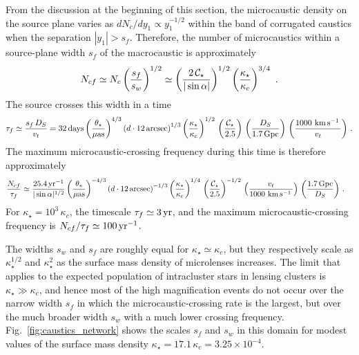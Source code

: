 \documentclass{aastex6}
\newcommand{\reffig}[1]{Fig.~\ref{fig:#1}}
\def\kms{\, {\rm km}\, {\rm s}^{-1}\, }
\begin{document}
From the discussion at the beginning of this section, the microcaustic density on the source plane varies as $dN_c/dy_1 \propto y_1^{-1/2}$ within the band of corrugated caustics when the separation $| y_1 | > s_f$. Therefore, the number of microcaustics within a source-plane width $s_f$ of the macrocaustic is approximately
\begin{equation}
\label{eq:ncf}
 N_{cf} \simeq N_c \left( s_f\over s_w \right)^{1/2} \simeq
   \left( 2\, \mathcal{C}_{\star} \over | \sin\alpha | \right)^{1/2}
  \left( \kappa_\star \over \kappa_c \right)^{3/4} ~.
\end{equation}
The source crosses this width in a time
\begin{align}
  \label{eq:tauf}
  \tau_{f} \simeq \frac{s_f\,D_S}{v_t} =
    32 \, {\rm days}
  \left( \frac{\theta_\star}{\mu{\rm as}} \right)^{4/3}
  \left( {d \cdot 12 \, {\rm arcsec}} \right)^{1/3}
  \left( \frac{\kappa_\star}{\kappa_c} \right)^{1/2}\, \left( {\mathcal{C}_{\star}\over 2.5} \right)\,
   \left( \frac{D_S}{1.7\,{\rm Gpc}} \right) \, \left( \frac{1000\,\kms}{v_t} \right)\,.
\end{align}
The maximum microcaustic-crossing frequency during this time is therefore approximately
\begin{align}
\label{eq:dNdtmax}
  \frac{N_{cf}}{\tau_f} & \simeq
 \frac{ 25.4 \, {\rm yr}^{-1} }{\vert \sin{\alpha} \vert^{1/2}} \left( \frac{\theta_*}{\mu{\rm as}} \right)^{-4/3} 
 \left( d\cdot 12 \, {\rm arcsec} \right)^{-1/3}
 \left( \frac{\kappa_*}{\kappa_c} \right)^{1/4}\,\left( {\mathcal{C}_{\star} \over 2.5} \right)^{-1/2}
  \,\left( \frac{v_t}{1000 \, \kms} \right) \, \left( \frac{1.7 \, {\rm Gpc}}{D_S} \right) \,.
\end{align}
For $\kappa_\star = 10^3\, \kappa_c$, the timescale $\tau_f \simeq 3 \, {\rm yr}$, and the maximum microcaustic-crossing frequency is $N_{cf} / \tau_f \simeq 100 \, {\rm yr}^{-1}$.

The widths $s_w$ and $s_f$ are roughly equal for $\kappa_\star \simeq \kappa_c$, but they respectively scale as $\kappa_\star^{1/2}$ and $\kappa_\star^2$ as the surface mass density of microlenses increases. The limit that applies to the expected population of intracluster stars in lensing clusters is $\kappa_\star \gg \kappa_c$, and hence most of the high magnification events do not occur over the narrow width $s_f$ in which the microcaustic-crossing rate is the largest, but over the much broader width $s_w$ with a much lower crossing frequency. \reffig{caustics_network} shows the scales $s_f$ and $s_w$ in this domain for modest values of the surface mass density $\kappa_\star = 17.1 \, \kappa_c = 3.25 \times 10^{-4}$.
\end{document}
